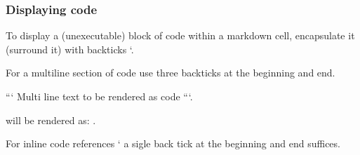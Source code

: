 \documentclass[letterpaper,10pt,english]{jupyterBook}
\begin{document}
\begin{sphinxVerbatim}[commandchars=\\\{\}]
                       
                                
 \PYGZbs{}
 \PYGZbs{}
 \PYGZbs{}\PYGZbs{} \PYGZbs{}\PYGZbs{}      
 \PYGZbs{} \PYGZbs{}      
 \PYGZbs{}         

\end{sphinxVerbatim}


\subsubsection{Displaying code}
\label{\detokenize{content/04_PythonEssentials/Intro_Jupyter_notebook:displaying-code}}
\sphinxAtStartPar
To display a (unexecutable)  block of code within a markdown cell, encapsulate it (surround it) with backticks `.

\sphinxAtStartPar
For a multiline section of code use three backticks at the beginning and end.

\sphinxAtStartPar
```
Multi line
text to be rendered as code
```.

\sphinxAtStartPar
will be rendered as: .

\begin{sphinxVerbatim}[commandchars=\\\{\}]

  
      
\end{sphinxVerbatim}

\sphinxAtStartPar
For inline code references ‘ a sigle back tick at the beginning and end suffices.
\end{document}
